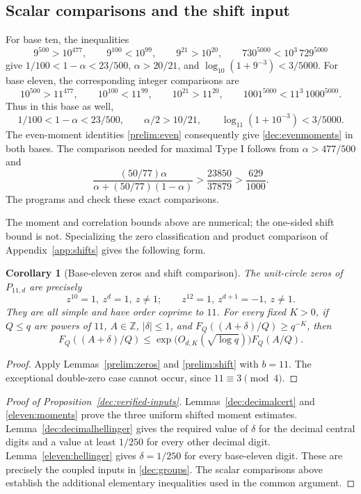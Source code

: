 \documentclass[11pt,a4paper]{article}
\theoremstyle{paperplain}
\newtheorem{corollary}[theorem]{Corollary}
\numberwithin{equation}{section}
\begin{document}
\subsection{Scalar comparisons and the shift input}

For base ten, the inequalities
\[
 9^{500}>10^{477},\qquad 9^{100}<10^{99},\qquad
 9^{21}>10^{20},\qquad 730^{5000}<10^3\,729^{5000}
\]
give $1/100<1-\alpha<23/500$, $\alpha>20/21$, and
$\log_{10}(1+9^{-3})<3/5000$.
For base eleven, the corresponding integer comparisons are
\[
 10^{500}>11^{477},\qquad 10^{100}<11^{99},\qquad
 10^{21}>11^{20},\qquad 1001^{5000}<11^3\,1000^{5000}.
\]
Thus in this base as well,
\[
 1/100<1-\alpha<23/500,\qquad \alpha/2>10/21,\qquad
 \log_{11}(1+10^{-3})<3/5000.
\]
The even-moment identities \eqref{prelim:even} consequently give
\eqref{dec:evenmoments} in both bases.
The comparison needed for maximal Type I follows from
$\alpha>477/500$ and
\[
 \frac{(50/77)\alpha}{\alpha+(50/77)(1-\alpha)}
 >\frac{23850}{37879}>\frac{629}{1000}.
\]
The programs  and
 check these exact comparisons.

The moment and correlation bounds above are numerical; the one-sided
shift bound is not. Specializing the zero classification and product
comparison of Appendix~\ref{app:shifts} gives the following form.

\begin{corollary}[Base-eleven zeros and shift comparison]
\label{eleven:zeros}\label{eleven:shift}
The unit-circle zeros of $P_{11,d}$ are precisely
\[
 z^{10}=1,\ z^d=1,\ z\ne1;
 \qquad
 z^{12}=1,\ z^{d+1}=-1,\ z\ne1.
\]
They are all simple and have order coprime to $11$. For every fixed $K>0$,
if $Q\leqslant q$ are powers of $11$, $A\in\mathbb Z$,
$|\delta|\leqslant1$, and $F_Q((A+\delta)/Q)\geqslant q^{-K}$, then
\begin{equation}\label{eleven:distortion}
 F_Q((A+\delta)/Q)
 \leqslant\exp\!\bigl(O_{d,K}(\sqrt{\log q})\bigr)F_Q(A/Q).
\end{equation}
\end{corollary}
\begin{proof}
Apply Lemmas~\ref{prelim:zeros} and \ref{prelim:shift} with $b=11$.
The exceptional double-zero case cannot occur, since $11\equiv3\pmod4$.
\end{proof}

\begin{proof}[Proof of Proposition~\ref{dec:verified-inputs}]
Lemmas~\ref{dec:decimalcert} and \ref{eleven:moments} prove the three
uniform shifted moment estimates. Lemma~\ref{dec:decimalhellinger}
gives the required value of $\delta$ for the decimal central digits
and a value at least $1/250$ for every other decimal digit.
Lemma~\ref{eleven:hellinger} gives $\delta=1/250$ for every base-eleven
digit. These are precisely the coupled inputs in \eqref{dec:groups}.
The scalar comparisons above establish the additional elementary
inequalities used in the common argument.
\end{proof}
\end{document}
